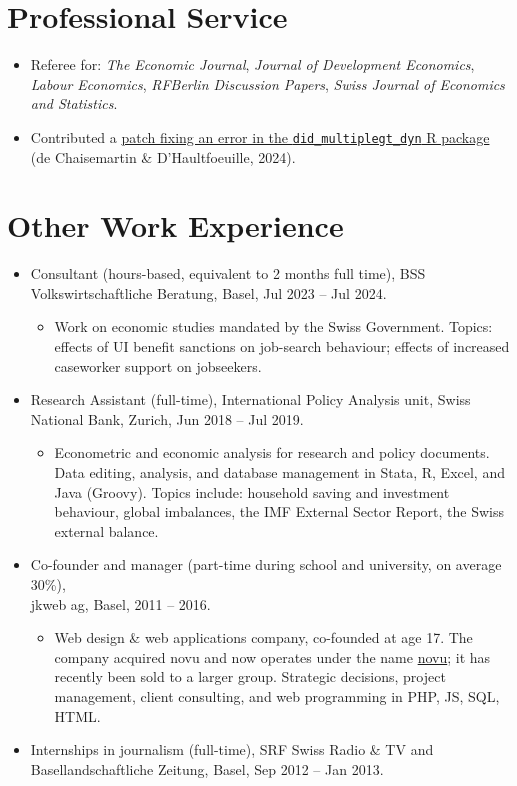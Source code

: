 \documentclass[11pt]{article}
\begin{document}
\section{Professional Service}
\begin{itemize}
\item Referee for: \textit{The Economic Journal}, \textit{Journal of Development Economics}, \textit{Labour Economics}, \textit{RFBerlin Discussion Papers}, \textit{Swiss Journal of Economics and Statistics}.
\item Contributed a \href{https://github.com/Credible-Answers/did_multiplegt_dyn/issues/167}{patch fixing an error in the \texttt{did\_multiplegt\_dyn} R package} (de Chaisemartin \& D'Haultfoeuille, 2024).
\end{itemize}

\section{Other Work Experience}
\begin{itemize}
\item Consultant (hours-based, equivalent to 2 months full time), BSS Volkswirtschaftliche Beratung, Basel, Jul 2023 -- Jul 2024.
  \begin{itemize}[label=--]
  \item Work on economic studies mandated by the Swiss Government. Topics: effects of UI benefit sanctions on job-search behaviour; effects of increased caseworker support on jobseekers.
  \end{itemize}
\item Research Assistant (full-time), International Policy Analysis unit, Swiss National Bank, Zurich, Jun 2018 -- Jul 2019.
  \begin{itemize}[label=--]
  \item Econometric and economic analysis for research and policy documents. Data editing, analysis, and database management in Stata, R, Excel, and Java (Groovy). Topics include: household saving and investment behaviour, global imbalances, the IMF External Sector Report, the Swiss external balance.
  \end{itemize}
\item Co-founder and manager (part-time  during school and university, on average 30\%), \\jkweb ag, Basel, 2011 -- 2016.
  \begin{itemize}[label=--]
  \item Web design \& web applications company, co-founded at age 17. The company acquired novu and now operates under the name \href{https://novu.ch/}{novu}; it has recently been sold to a larger group. Strategic decisions, project management, client consulting, and web programming in PHP, JS, SQL, HTML.
  \end{itemize}
\item Internships in journalism (full-time), SRF Swiss Radio \& TV and Basellandschaftliche Zeitung, Basel, Sep 2012 -- Jan 2013.
\end{itemize}
\end{document}
